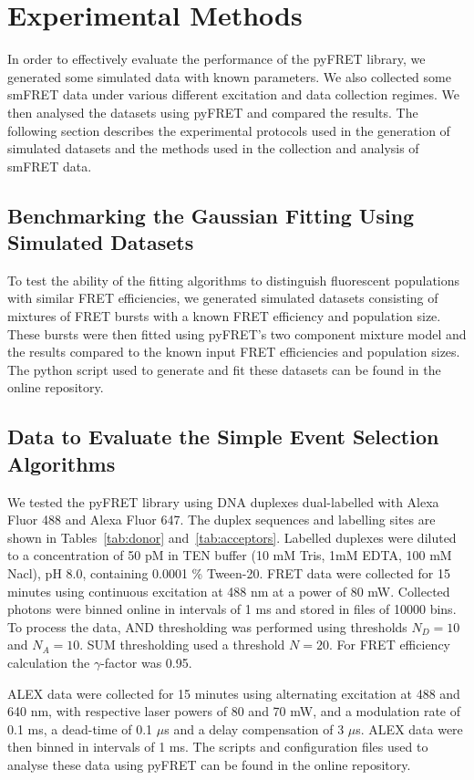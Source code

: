 \section{Experimental Methods}
In order to effectively evaluate the performance of the pyFRET library, we generated some simulated data with known parameters.  We also collected some smFRET data under various different excitation and data collection regimes. We then analysed the datasets using pyFRET and compared the results. The following section describes the experimental protocols used in the generation of simulated datasets and the methods used in the collection and analysis of smFRET data. 

\subsection{Benchmarking the Gaussian Fitting Using Simulated Datasets}
To test the ability of the fitting algorithms to distinguish fluorescent populations with similar FRET efficiencies, we generated simulated datasets consisting of mixtures of FRET bursts with a known FRET efficiency and population size. These bursts were then fitted using pyFRET's two component mixture model and the results compared to the known input FRET efficiencies and population sizes. The python script used to generate and fit these datasets can be found in the online repository. 

\subsection{Data to Evaluate the Simple Event Selection Algorithms}
We tested the pyFRET library using DNA duplexes dual-labelled with Alexa Fluor 488 and Alexa Fluor 647. The duplex sequences and labelling sites are shown in Tables~\ref{tab:donor} and~\ref{tab:acceptors}. Labelled duplexes were diluted to a concentration of 50 pM in TEN buffer (10 mM Tris, 1mM EDTA, 100 mM Nacl), pH 8.0, containing 0.0001 \% Tween-20. FRET data were collected for 15 minutes using continuous excitation at 488 nm at a power of 80 mW. Collected photons were binned online in intervals of 1 ms and stored in files of 10000 bins. To process the data, AND thresholding was performed using thresholds $N_D = 10$ and $N_A = 10$. SUM thresholding used a threshold $N = 20$. For FRET efficiency calculation the $\gamma$-factor was 0.95.

ALEX data were collected for 15 minutes using alternating excitation at 488 and 640 nm, with respective laser powers of 80 and 70 mW, and a modulation rate of 0.1 ms, a dead-time of 0.1 $\mu$s and a delay compensation of 3 $\mu$s. ALEX data were then binned in intervals of 1 ms. The scripts and configuration files used to analyse these data using pyFRET can be found in the online repository.

